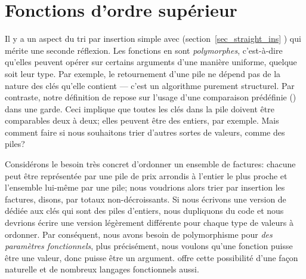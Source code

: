 \section{Fonctions d'ordre supérieur}


Il y a un aspect du tri par insertion simple avec 
(section~\ref{sec_straight_ins} ) qui
mérite une seconde réflexion. Les fonctions en \Erlang sont
\emph{polymorphes},
c'est-à-dire qu'elles peuvent opérer sur certains arguments d'une
manière uniforme, quelque soit leur type. Par exemple, le retournement
d'une pile ne dépend pas de la nature des clés qu'elle contient ---
c'est un algorithme purement structurel. Par contraste, notre
définition de  repose sur l'usage d'une comparaison
prédéfinie (\erlcode{>}) dans une garde. Ceci implique que toutes les
clés dans la pile doivent être comparables deux à deux; elles peuvent
être des entiers, par exemple. Mais comment faire si nous souhaitons
trier d'autres sortes de valeurs, comme des piles?

Considérons le besoin très concret d'ordonner un ensemble de factures:
chacune peut être représentée par une pile de prix arrondis à l'entier
le plus proche et l'ensemble lui-même par une pile; nous voudrions
alors trier par insertion les factures, disons, par totaux
non-décroissants. Si nous écrivons une version de 
dédiée aux clés qui sont des piles d'entiers, nous dupliquons du code
et nous devrions écrire une version légèrement différente pour chaque
type de valeurs à ordonner. Par conséquent, nous avons besoin de
polymorphisme pour \emph{des paramètres fonctionnels}, plus
précisément, nous voulons qu'une fonction puisse être une valeur, donc
puisse être un argument. \Erlang offre cette possibilité d'une façon
naturelle et de nombreux langages fonctionnels aussi. 

